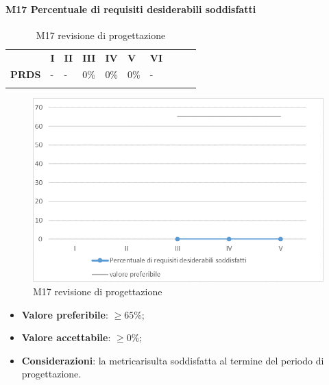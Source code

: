 \paragraph{M17 Percentuale di requisiti desiderabili soddisfatti} \mbox{}
\begin{longtable}[H!] {						
		>{}p{50mm}  		
		>{}p{8mm}
		>{}p{8mm}		
		>{}p{8mm}		
		>{}p{8mm}		
		>{}p{8mm}		
		>{}p{8mm}
		>{}p{8mm}
		>{}p{8mm}
		>{}p{8mm}
	}
	\rowcolor{gray!50}
	\textbf{} & \textbf{I} & \textbf{II} & \textbf{III} & \textbf{IV} & \textbf{V} & \textbf{VI} \TBstrut \\ [2mm]
	\textbf{PRDS} & - & - & 0\% & 0\% & 0\% & - \TBstrut \\ [2mm]
	\rowcolor{white}
	\caption{M17 revisione di progettazione\glo}
\end{longtable}
\begin{figure}[H] 	
\includegraphics[width=\linewidth]{./img/grafici/RP14.png}	
\caption{M17 revisione di progettazione\glo}	
\end{figure}
\begin{itemize}
	\item \textbf{Valore preferibile}: $\ge 65\%$;
	\item \textbf{Valore accettabile}: $\ge 0\%$;
	\item \textbf{Considerazioni}: la metrica\glosp risulta soddisfatta al termine del periodo di progettazione\glo.
\end{itemize}
